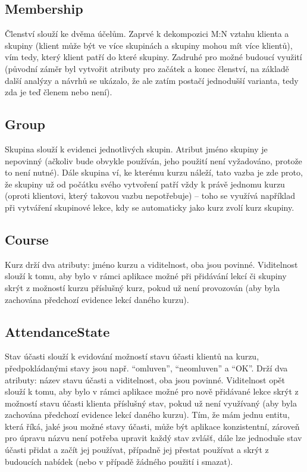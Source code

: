         \subsection{Membership}
        Členství slouží ke dvěma účelům. Zaprvé k dekompozici M:N vztahu klienta a skupiny (klient může být ve více skupinách a skupiny mohou mít více klientů), vím tedy, který klient patří do které skupiny. Zadruhé pro možné budoucí využití (původní záměr byl vytvořit atributy pro začátek a konec členství, na základě další analýzy a návrhů se ukázalo, že ale zatím postačí jednodušší varianta, tedy zda je teď členem nebo není).
        
        \subsection{Group}
        Skupina slouží k evidenci jednotlivých skupin. Atribut jméno skupiny je nepovinný (ačkoliv bude obvykle používán, jeho použití není vyžadováno, protože to není nutné). Dále skupina ví, ke kterému kurzu náleží, tato vazba je zde proto, že skupiny už od počátku svého vytvoření patří vždy k právě jednomu kurzu (oproti klientovi, který takovou vazbu nepotřebuje) -- toho se využívá například při vytváření skupinové lekce, kdy se automaticky jako kurz zvolí kurz skupiny.
        
        \subsection{Course}
        Kurz drží dva atributy: jméno kurzu a viditelnost, oba jsou povinné. Viditelnost slouží k tomu, aby bylo v rámci aplikace možné při přidávání lekcí či skupiny skrýt z možností kurzu příslušný kurz, pokud už není provozován (aby byla zachována předchozí evidence lekcí daného kurzu).
        
        \subsection{AttendanceState}
        Stav účasti slouží k evidování možností stavu účasti klientů na kurzu, předpokládanými stavy jsou např. \enquote{omluven}, \enquote{neomluven} a \enquote{OK}. Drží dva atributy: název stavu účasti a viditelnost, oba jsou povinné. Viditelnost opět slouží k tomu, aby bylo v rámci aplikace možné pro nově přidávané lekce skrýt z možností stavu účasti klienta příslušný stav, pokud už není využívaný (aby byla zachována předchozí evidence lekcí daného kurzu). Tím, že mám jednu entitu, která říká, jaké jsou možné stavy účasti, může být aplikace konzistentní, zároveň pro úpravu názvu není potřeba upravit každý stav zvlášť, dále lze jednoduše stav účasti přidat a začít jej používat, případně jej přestat používat a skrýt z budoucích nabídek (nebo v případě žádného použití i smazat).
        
